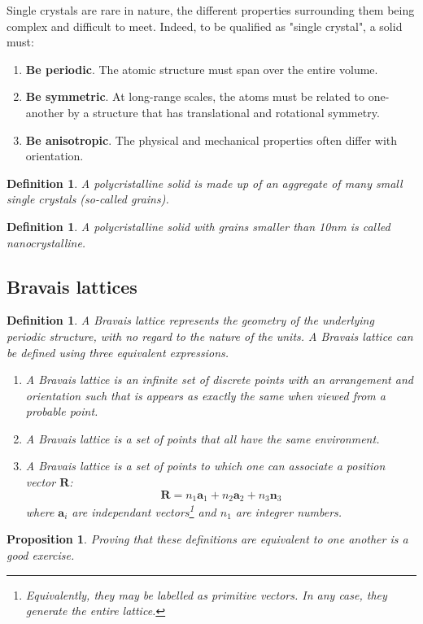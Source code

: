 \documentclass[l1pt, oneside,a4paper]{article}
\newtheorem{definition}[theorem]{Definition}
\newtheorem{property}[theorem]{Proposition}
\begin{document}
  Single crystals are rare in nature, the different properties surrounding them being complex and difficult to meet. Indeed, to be qualified as "single crystal", a solid must:
  \begin{enumerate}
    \item\textbf{Be periodic}. The atomic structure must span over the entire volume.
    \item \textbf{Be symmetric}. At long-range scales, the atoms must be related to one-another by a structure that has translational and rotational symmetry.
    \item \textbf{Be anisotropic}. The physical and mechanical properties often differ with orientation.
  \end{enumerate}

  \begin{definition}
    A polycristalline solid is made up of an aggregate of many small single crystals (so-called grains).
  \end{definition}
  \begin{definition}
    A polycristalline solid with grains smaller than 10nm is called nanocrystalline.
  \end{definition}

  \subsection*{Bravais lattices}
  \begin{definition}
    A Bravais lattice represents the geometry of the underlying periodic structure, with no regard to the nature of the units. A Bravais lattice can be defined using three equivalent expressions.
    \begin{enumerate}
        \item A Bravais lattice is an infinite set of discrete points with an arrangement and orientation such that is appears as exactly the same when viewed from a probable point.
        \item A Bravais lattice is a set of points that all have the same environment.
        \item A Bravais lattice is a set of points to which one can associate a position vector $\bm{R}$:
        \begin{equation}
            \bm{R} = n_1\bm{a}_1+n_2\bm{a}_2+n_3\bm{n}_3
        \end{equation}
        where $\bm{a}_i$ are independant vectors\footnote{Equivalently, they may be labelled as primitive vectors. In any case, they generate the entire lattice.} and $n_1$ are integrer numbers.
    \end{enumerate}
  \end{definition}
  \begin{property}
    Proving that these definitions are equivalent to one another is a good exercise.
  \end{property}
\end{document}
